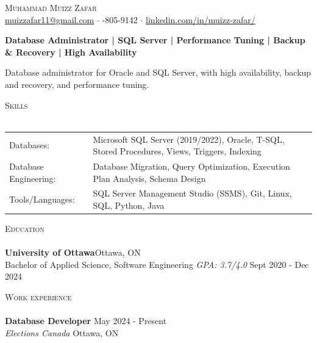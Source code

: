 \documentclass[a4paper]{article}
\newcommand{\lineunder} {
    \vspace*{-8pt} \\
    \hspace*{-18pt} \hrulefill \\
}
\newcommand{\header} [1] {
    {\hspace*{-18pt}\vspace*{6pt} \textsc{#1}}
    \vspace*{-6pt} \lineunder
}
\begin{document}
\vspace*{-40pt}
\vspace*{-10pt}
\begin{center}
	{\Huge \scshape {Muhammad Muizz Zafar}}\\
	\faSend \space \href{mailto:muizzafar11@gmail.com}{muizzafar11@gmail.com} $\cdot$ \faPhoneSquare {}-805-9142 $\cdot$ \faLinkedinSquare \space \href{https://www.linkedin.com/in/muizz-zafar/}{linkedin.com/in/muizz-zafar/}
	\\
\end{center}
\vspace{-5pt}
\begin{center}
\textbf{Database Administrator | SQL Server | Performance Tuning | Backup \& Recovery | High Availability}
\end{center}
\begin{center}
Database administrator for Oracle and SQL Server, with high availability, backup and recovery, and performance tuning.
\end{center}
\header{Skills}
\begin{tabular}{ l l }
Databases: & Microsoft SQL Server (2019/2022), Oracle, T-SQL, Stored Procedures, Views, Triggers, Indexing \\
Database Engineering: & Database Migration, Query Optimization, Execution Plan Analysis, Schema Design \\
Tools/Languages: & SQL Server Management Studio (SSMS), Git, Linux, SQL, Python, Java \\
\end{tabular}
\vspace{2mm}
\header{Education}
\textbf{University of Ottawa}\hfill Ottawa, ON\\
Bachelor of Applied Science, Software Engineering \textit{GPA: 3.7/4.0} \hfill Sept 2020 - Dec 2024\\
\vspace{2mm}
\header{Work experience}
\vspace{1.5mm}
\textbf{Database Developer} \hfill May 2024 - Present\\
\textit{Elections Canada} \hfill Ottawa, ON\\
\vspace{-2mm}
\end{document}
